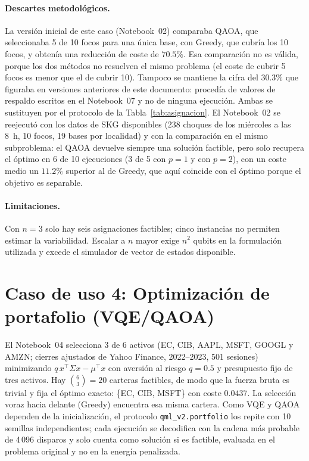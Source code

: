 \paragraph{Descartes metodológicos.}
La versión inicial de este caso (Notebook~02) comparaba QAOA, que seleccionaba 5 de 10 focos para una única base, con Greedy, que cubría los 10 focos, y obtenía una reducción de coste de $70.5\%$. Esa comparación no es válida, porque los dos métodos no resuelven el mismo problema (el coste de cubrir 5 focos es menor que el de cubrir 10). Tampoco se mantiene la cifra del $30.3\%$ que figuraba en versiones anteriores de este documento: procedía de valores de respaldo escritos en el Notebook~07 y no de ninguna ejecución. Ambas se sustituyen por el protocolo de la Tabla~\ref{tab:asignacion}. El Notebook~02 se reejecutó con los datos de SKG disponibles (238 choques de los miércoles a las 8~h, 10 focos, 19 bases por localidad) y con la comparación en el mismo subproblema: el QAOA devuelve siempre una solución factible, pero solo recupera el óptimo en 6 de 10 ejecuciones (3 de 5 con $p=1$ y con $p=2$), con un coste medio un $11.2\%$ superior al de Greedy, que aquí coincide con el óptimo porque el objetivo es separable.

\paragraph{Limitaciones.}
Con $n=3$ solo hay seis asignaciones factibles; cinco instancias no permiten estimar la variabilidad. Escalar a $n$ mayor exige $n^2$ qubits en la formulación utilizada y excede el simulador de vector de estados disponible.


\section{Caso de uso 4: Optimización de portafolio (VQE/QAOA)}

El Notebook~04 selecciona 3 de 6 activos (EC, CIB, AAPL, MSFT, GOOGL y AMZN; cierres ajustados de Yahoo Finance, 2022--2023, 501 sesiones) minimizando $q\,x^\top\Sigma x-\mu^\top x$ con aversión al riesgo $q=0.5$ y presupuesto fijo de tres activos. Hay $\binom{6}{3}=20$ carteras factibles, de modo que la fuerza bruta es trivial y fija el óptimo exacto: \{EC, CIB, MSFT\} con coste $0.0437$. La selección voraz hacia delante (Greedy) encuentra esa misma cartera. Como VQE y QAOA dependen de la inicialización, el protocolo \texttt{qml\_v2.portfolio} los repite con 10 semillas independientes; cada ejecución se decodifica con la cadena más probable de 4\,096 disparos y solo cuenta como solución si es factible, evaluada en el problema original y no en la energía penalizada.

